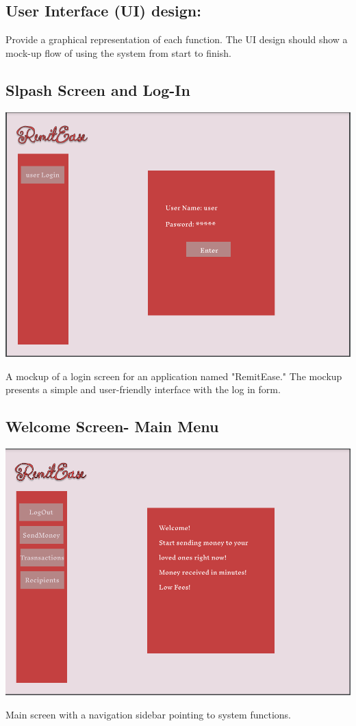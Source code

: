 \documentclass[onecolumn, letterpaper, ]{report}
\begin{document}
    
    \begin{landscape}
        \section{\colorbox{white!95!black}{User Interface (UI) design:}}
    Provide a graphical representation of each function. The UI design should show a mock-up flow of using the system from start to finish.

    \subsection{Slpash Screen and Log-In}
        \includegraphics[width=.8\linewidth]{MockUps/login.PNG}
        
        A mockup of a login screen for an application named "RemitEase." The mockup presents a simple and user-friendly interface with the log in form.
    \end{landscape}

    \begin{landscape}
        \subsection{Welcome Screen- Main Menu}
        \includegraphics[width=1\linewidth]{MockUps/2welcome.PNG}

        Main screen with a navigation sidebar pointing to system functions.
    \end{landscape}
\end{document}
